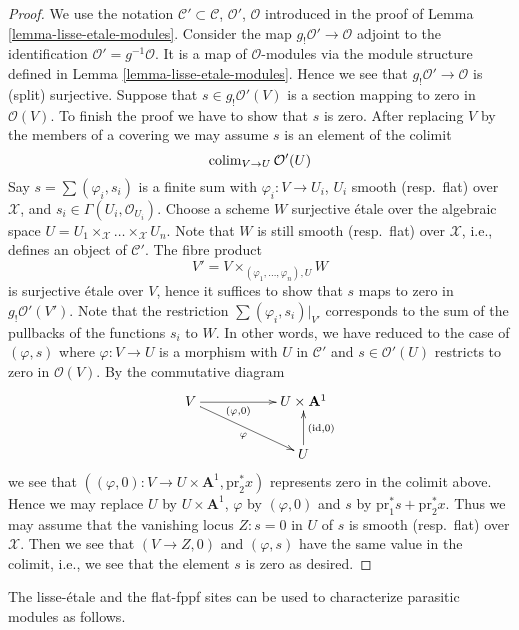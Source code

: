 \begin{proof}
We use the notation
$\mathcal{C}' \subset \mathcal{C}$, $\mathcal{O}'$, $\mathcal{O}$
introduced in the proof of Lemma \ref{lemma-lisse-etale-modules}.
Consider the map $g_!\mathcal{O}' \to \mathcal{O}$ adjoint to
the identification $\mathcal{O}' = g^{-1}\mathcal{O}$.
It is a map of $\mathcal{O}$-modules via the module structure
defined in Lemma \ref{lemma-lisse-etale-modules}.
Hence we see that $g_!\mathcal{O}' \to \mathcal{O}$ is
(split) surjective. Suppose that $s \in g_!\mathcal{O}'(V)$ is a section
mapping to zero in $\mathcal{O}(V)$. To finish the proof we have to show
that $s$ is zero. After replacing $V$ by the members
of a covering we may assume $s$ is an element of the colimit
$$
\mathop{\rm colim}\nolimits_{V \to U} \mathcal{O}'(U)
$$
Say $s = \sum (\varphi_i, s_i)$ is a finite sum with
$\varphi_i : V \to U_i$, $U_i$ smooth (resp.\ flat) over $\mathcal{X}$, and
$s_i \in \Gamma(U_i, \mathcal{O}_{U_i})$. Choose a scheme $W$ surjective
\'etale over the algebraic space
$U = U_1 \times_\mathcal{X} \ldots \times_\mathcal{X} U_n$.
Note that $W$ is still smooth (resp.\ flat) over $\mathcal{X}$, i.e.,
defines an object of $\mathcal{C}'$. The fibre product
$$
V' = V \times_{(\varphi_1, \ldots, \varphi_n), U} W
$$
is surjective \'etale over $V$, hence it suffices to show that $s$ maps
to zero in $g_!\mathcal{O}'(V')$. Note that the restriction
$\sum (\varphi_i, s_i)|_{V'}$ corresponds to the sum of the pullbacks
of the functions $s_i$ to $W$. In other words, we have reduced to the case
of $(\varphi, s)$ where $\varphi : V \to U$ is a morphism with $U$ in
$\mathcal{C}'$ and $s \in \mathcal{O}'(U)$ restricts to zero in
$\mathcal{O}(V)$. By the commutative diagram
$$
\xymatrix{
V \ar[rr]_-{(\varphi, 0)} \ar[rrd]_\varphi & & U \times \mathbf{A}^1 \\
& & U \ar[u]_{(\text{id}, 0)}
}
$$
we see that
$((\varphi, 0) : V \to U \times \mathbf{A}^1, \text{pr}_2^*x)$
represents zero in the colimit above. Hence we may
replace $U$ by $U \times \mathbf{A}^1$, $\varphi$ by $(\varphi, 0)$
and $s$ by $\text{pr}_1^*s + \text{pr}_2^*x$. Thus we may assume that
the vanishing locus $Z : s = 0$ in $U$ of $s$ is smooth (resp.\ flat)
over $\mathcal{X}$. Then we see that $(V \to Z, 0)$ and $(\varphi, s)$
have the same value in the colimit, i.e., we see that the element $s$
is zero as desired.
\end{proof}

\noindent
The lisse-\'etale and the flat-fppf sites can be used to characterize
parasitic modules as follows.

